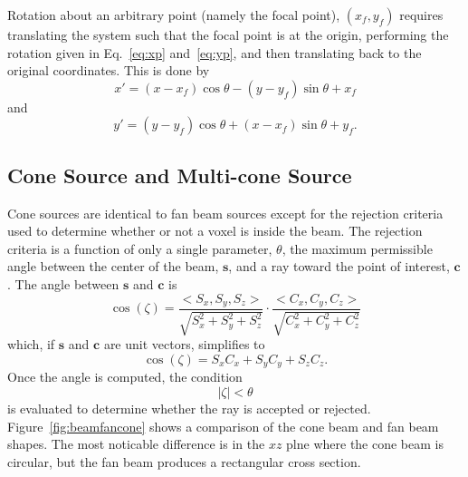 Rotation about an arbitrary point (namely the focal point), $(x_f, y_f)$ requires translating the system such that the focal point is at the origin, performing the rotation given in Eq.~\ref{eq:xp} and~\ref{eq:yp}, and then translating back to the original coordinates. This is done by
\begin{equation}\label{eq:xp2}
x' = (x-x_f) \cos \theta - (y-y_f) \sin \theta + x_f
\end{equation}
and
\begin{equation}\label{eq:yp2}
y' = (y - y_f) \cos \theta + (x - x_f) \sin \theta + y_f.
\end{equation}

\subsection{Cone Source and Multi-cone Source}
Cone sources are identical to fan beam sources except for the rejection criteria used to determine whether or not a voxel is inside the beam. The rejection criteria is a function of only a single parameter, $\theta$, the maximum permissible angle between the center of the beam, $\boldsymbol{s}$, and a ray toward the point of interest, $\boldsymbol{c}$. The angle between $\boldsymbol{s}$ and $\boldsymbol{c}$ is
\begin{equation}\label{eq:zetacos}
\cos(\zeta) = \frac{<S_x, S_y, S_z>}{\sqrt{S_x^2 + S_y^2 + S_z^2}} \cdot \frac{<C_x, C_y, C_z>}{\sqrt{C_x^2 + C_y^2 + C_z^2}}
\end{equation}
which, if $\boldsymbol{s}$ and $\boldsymbol{c}$ are unit vectors, simplifies to
\begin{equation}\label{eq:zetacos}
\cos(\zeta) = S_x C_x + S_y C_y + S_z C_z.
\end{equation}
Once the angle is computed, the condition
\begin{equation}\label{eq:zetacon}
|\zeta| < \theta
\end{equation}
is evaluated to determine whether the ray is accepted or rejected. Figure~\ref{fig:beamfancone} shows a comparison of the cone beam and fan beam shapes. The most noticable difference is in the $xz$ plne where the cone beam is circular, but the fan beam produces a rectangular cross section.

